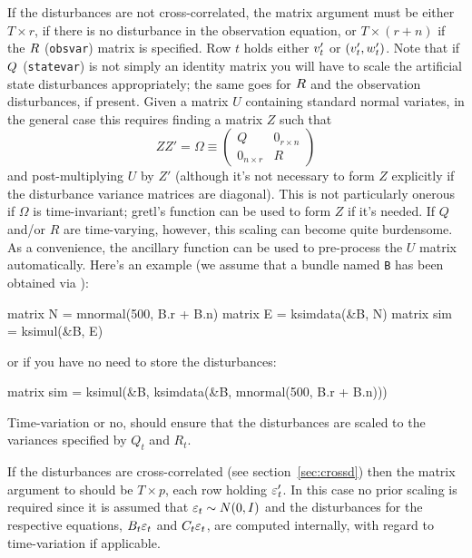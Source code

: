 If the disturbances are not cross-correlated, the matrix argument must
be either $T \times r$, if there is no disturbance in the observation
equation, or $T \times (r+n)$ if the $R$ (\texttt{obsvar})
matrix is specified. Row $t$ holds either $v_t'$ or
$(v_t', w_t')$. Note that if $Q$
(\texttt{statevar}) is not simply an identity matrix you will have to
scale the artificial state disturbances appropriately; the same goes
for $R$ and the observation disturbances, if present. Given a
matrix $U$ containing standard normal variates, in the general case
this requires finding a matrix $Z$ such that
\[
ZZ' = \Omega \equiv \left(
\begin{array}{ll}
Q & 0_{r \times n} \\
0_{n\times r} & R
\end{array}
\right)
\]
and post-multiplying $U$ by $Z'$ (although it's not necessary to form
$Z$ explicitly if the disturbance variance matrices are
diagonal). This is not particularly onerous if $\Omega$ is
time-invariant; gretl's  function can be used to form $Z$
if it's needed. If $Q$ and/or $R$ are time-varying, however, this
scaling can become quite burdensome. As a convenience, the ancillary
function  can be used to pre-process the $U$ matrix
automatically. Here's an example (we assume that a bundle named
\texttt{B} has been obtained via ):
%
\begin{code}
matrix N = mnormal(500, B.r + B.n)
matrix E = ksimdata(&B, N)
matrix sim = ksimul(&B, E)
\end{code}
%
or if you have no need to store the disturbances:
%
\begin{code}
matrix sim = ksimul(&B, ksimdata(&B, mnormal(500, B.r + B.n)))
\end{code}
%
Time-variation or no,  should ensure that the
disturbances are scaled to the variances specified by $Q_t$ and $R_t$.

If the disturbances are cross-correlated (see
section~\ref{sec:crossd}) then the matrix argument to 
should be $T \times p$, each row holding $\varepsilon_t'$. In this case
no prior scaling is required since it is assumed that
$\varepsilon_t \sim N(0, I)$ and the disturbances for the respective
equations, $B_t \varepsilon_t$ and $C_t \varepsilon_t$,
are computed internally, with regard to time-variation if applicable.

